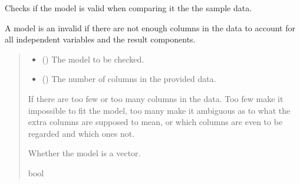 \documentclass[letterpaper,10pt,english]{sphinxmanual}
\begin{document}

\begin{fulllineitems}
\label{\detokenize{ModelFitter:src.ModelFitter.check_model_is_valid_vector}}
\pysigstartsignatures
{}
\pysigstopsignatures
\sphinxAtStartPar
Checks if the model is valid when comparing it the the sample data.

\sphinxAtStartPar
A model is an invalid if there are not enough columns in the data to account for all
independent variables and the result components.
\begin{quote}\begin{description}
\begin{itemize}
\item {} 
\sphinxAtStartPar
{} ({\hyperref[\detokenize{VPCModel:src.VPCModel.VPCModel}]{}}) \textendash{} The model to be checked.

\item {} 
\sphinxAtStartPar
{} () \textendash{} The number of columns in the provided data.

\end{itemize}

\sphinxAtStartPar
{} \textendash{} If there are too few or too many columns in the data.    Too few make it impossible to fit the model, too many make it ambiguous as to what the extra    columns are supposed to mean, or which columns are even to be regarded and which ones not.

\sphinxAtStartPar
Whether the model is a vector.

\sphinxAtStartPar
bool

\end{description}\end{quote}

\end{fulllineitems}
\end{document}
